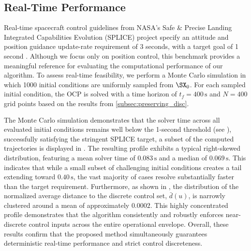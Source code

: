 \documentclass[conf]{new-aiaa}
\begin{document}
\subsection{Real-Time Performance}\label{subsec:performance}

Real-time spacecraft control guidelines from NASA's Safe \& Precise Landing Integrated Capabilities Evolution (SPLICE) project specify an attitude and position guidance update-rate requirement of 3 seconds, with a target goal of 1 second \cite{sostaric_splice_2021}. Although we focus only on position control, this benchmark provides a meaningful reference for evaluating the computational performance of our algorithm. To assess real-time feasibility, we perform a Monte Carlo simulation in which 1000 initial conditions are uniformly sampled from $\SX_0$. For each sampled initial condition, the OCP is solved with a time horizon of $t_f = 400\,\text{s}$ and $N = 400$ grid points based on the results from \cref{subsec:preserving_disc}.

The Monte Carlo simulation demonstrates that the solver time across all evaluated initial conditions remains well below the 1-second threshold (see ), successfully satisfying the stringent SPLICE target, a subset of the computed trajectories is displayed in . The resulting profile exhibits a typical right-skewed distribution, featuring a mean solver time of $0.083\,\text{s}$ and a median of $0.069\,\text{s}$. This indicates that while a small subset of challenging initial conditions creates a tail extending toward $0.40\,\text{s}$, the vast majority of cases resolve substantially faster than the target requirement. Furthermore, as shown in , the distribution of the normalized average distance to the discrete control set, $\bar{d}(u)$, is narrowly clustered around a mean of approximately $0.0002$. This highly concentrated profile demonstrates that the algorithm consistently and robustly enforces near-discrete control inputs across the entire operational envelope. Overall, these results confirm that the proposed method simultaneously guarantees deterministic real-time performance and strict control discreteness.
\end{document}
